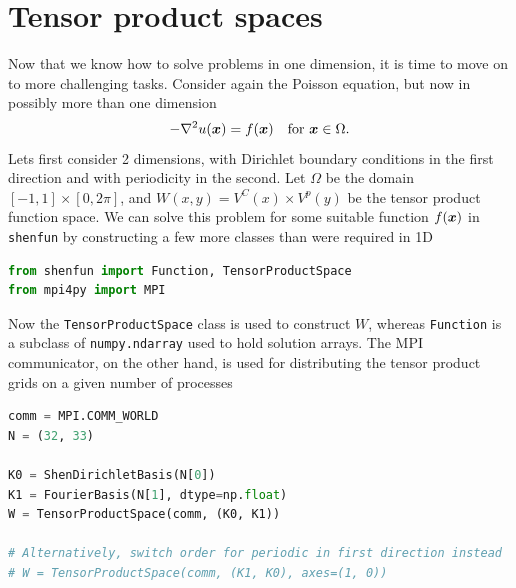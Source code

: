 \documentclass[%
oneside,                 %
final,                   %
10pt]{article}
\theoremstyle{definition}
\begin{document}
\section{Tensor product spaces}
\label{sec:tensorproductspaces}
Now that we know how to solve problems in one dimension, it is time to move on to more challenging tasks. Consider again the Poisson equation, but now in possibly more than one dimension
\begin{equation}
 -\nabla^2 u(\boldsymbol{x}) = f(\boldsymbol{x}) \quad \text{for }\boldsymbol{x} \in \Omega.
\end{equation}
Lets first consider 2 dimensions, with Dirichlet boundary conditions in the first direction and with periodicity in the second. Let $\Omega$ be the domain $[-1, 1] \times [0, 2 \pi]$, and $W(x,y) = V^C(x) \times V^p(y)$ be the tensor product function space. We can solve this problem for some suitable function $f(\boldsymbol{x})$ in \texttt{shenfun} by constructing a few more classes than were required in 1D
\begin{lstlisting}[language=Python,style=yellow2_fb]
from shenfun import Function, TensorProductSpace
from mpi4py import MPI
\end{lstlisting}
Now the \texttt{TensorProductSpace} class is used to construct $W$, whereas \texttt{Function} is a subclass of \texttt{numpy.ndarray} used to hold solution arrays. The MPI communicator, on the other hand, is used for distributing the tensor product grids on a given number of processes
\begin{lstlisting}[language=Python,style=yellow2_fb]
comm = MPI.COMM_WORLD
N = (32, 33)

K0 = ShenDirichletBasis(N[0])
K1 = FourierBasis(N[1], dtype=np.float)
W = TensorProductSpace(comm, (K0, K1))

# Alternatively, switch order for periodic in first direction instead
# W = TensorProductSpace(comm, (K1, K0), axes=(1, 0))
\end{lstlisting}
\end{document}
